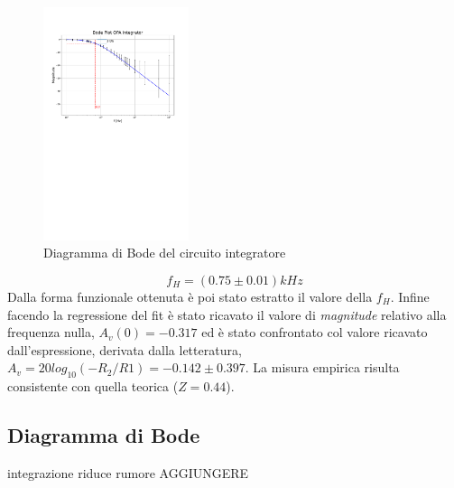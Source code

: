 \documentclass[journal]{IEEEtran}
\begin{document}
\begin{figure}[H]%
\begin {center}
\includegraphics[width=0.38\textwidth]{analysis/output/OPA-integrator_bode(mag).pdf}
\caption{Diagramma di Bode del circuito integratore}
\label{fig:integ-bode}
\end {center}
\end{figure}
\[f_H = (0.75 \pm 0.01) kHz\]
Dalla forma funzionale ottenuta è poi stato estratto il valore della $f_H$.
Infine facendo la regressione del fit è stato ricavato il valore di \textit{magnitude} relativo alla frequenza nulla, $A_{v}(0)=-0.317$ ed è stato confrontato col valore ricavato dall'espressione, derivata dalla letteratura, $A_{v} = 20log_{10}(-R_{2}/R{1}) = -0.142 \pm 0.397 $. La misura empirica risulta consistente con quella teorica ($Z=0.44$).
\subsection{Diagramma di Bode}

integrazione riduce rumore AGGIUNGERE
\end{document}
